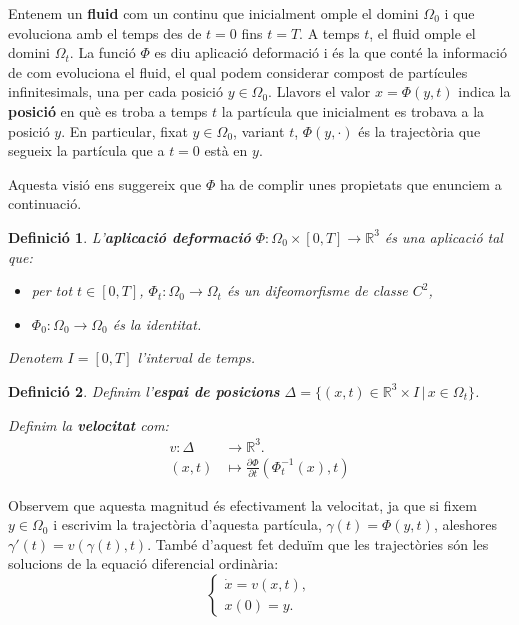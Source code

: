 \documentclass{article}
\numberwithin{equation}{section}
\newtheorem{definicio}{Definici\'{o}}[section]
\begin{document}
Entenem un \textbf{fluid} com un continu que inicialment omple el domini $\Omega_0$ i que evoluciona amb el temps des de $t=0$ fins $t=T$. A temps $t$, el fluid omple el domini $\Omega_t$. La funci\'{o} $\Phi$ es diu aplicaci\'{o} deformaci\'{o} i \'{e}s la que cont\'{e} la informaci\'{o} de com evoluciona el fluid, el qual podem considerar compost de part\'{i}cules infinitesimals, una per cada posici\'{o} $y\in\Omega_0$. Llavors el valor $x=\Phi(y,t)$ indica la \textbf{posici\'{o}} en qu\`{e} es troba a temps $t$ la part\'{i}cula que inicialment es trobava a la posici\'{o} $y$. En particular, fixat $y\in\Omega_0$, variant $t$, $\Phi(y,\cdot)$ \'{e}s la traject\`{o}ria que segueix la part\'{i}cula que a $t=0$ est\`{a} en $y$.

Aquesta visi\'{o} ens suggereix que $\Phi$ ha de complir unes propietats que enunciem a continuaci\'{o}.

\begin{definicio}
L'\textbf{aplicaci\'{o} deformaci\'{o}} $\Phi:\Omega_0\times[0,T]\rightarrow\mathbb{R}^3$ \'{e}s una aplicaci\'{o} tal que:
\begin{itemize}
\item per tot $t\in[0,T]$, $\Phi_t:\Omega_0\rightarrow\Omega_t$ \'{e}s un difeomorfisme de classe $C^2$,
\item $\Phi_0:\Omega_0\rightarrow\Omega_0$ \'{e}s la identitat.
\end{itemize}

Denotem $I=[0,T]$ l'interval de temps.
\end{definicio}

\begin{definicio}
Definim l'\textbf{espai de posicions} $\Delta=\{(x,t)\in\mathbb{R}^3\times I\,|\,x\in\Omega_t\}$.

Definim la \textbf{velocitat} com:
\[
\begin{split}
v:\Delta&\longrightarrow\mathbb{R}^3.\\
(x,t)&\longmapsto\frac{\partial\Phi}{\partial t}(\Phi_t^{-1}(x),t)
\end{split}
\]
\end{definicio}

Observem que aquesta magnitud \'{e}s efectivament la velocitat, ja que si fixem $y\in\Omega_0$ i escrivim la traject\`{o}ria d'aquesta part\'{i}cula, $\gamma(t)=\Phi(y,t)$, aleshores $\gamma'(t)=v(\gamma(t),t)$. Tamb\'{e} d'aquest fet dedu\"{i}m que les traject\`{o}ries s\'{o}n les solucions de la equaci\'{o} diferencial ordin\`{a}ria:
\begin{equation}\label{Equ. trajectoria}
\left\{\begin{array}{l}\dot{x}=v(x,t),\\x(0)=y.\end{array}\right.
\end{equation}
\end{document}
